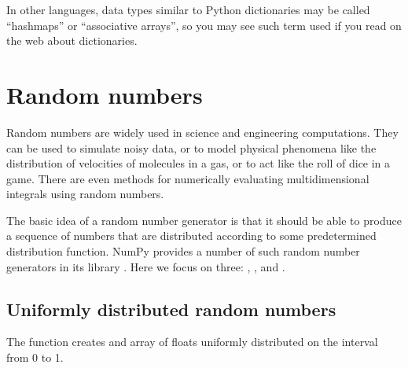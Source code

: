 \documentclass[letterpaper,10pt,english]{sphinxmanual}
\begin{document}
\sphinxAtStartPar
In other languages, data types similar to Python dictionaries may be called “hashmaps” or “associative arrays”, so you may see such term used if you read on the web about dictionaries.

\ignorespaces 

\section{Random numbers}
\label{\detokenize{chap3/chap3_arrays:random-numbers}}\label{\detokenize{chap3/chap3_arrays:index-8}}
\sphinxAtStartPar
Random numbers are widely used in science and engineering computations.  They can be used to simulate noisy data, or to model physical phenomena like the distribution of velocities of molecules in a gas, or to act like the roll of dice in a game.  There are even methods for numerically evaluating multi\sphinxhyphen{}dimensional integrals using random numbers.

\sphinxAtStartPar
The basic idea of a random number generator is that it should be able to produce a sequence of numbers that are distributed according to some predetermined distribution function.  NumPy provides a number of such random number generators in its library .  Here we focus on three: , , and .


\subsection{Uniformly distributed random numbers}
\label{\detokenize{chap3/chap3_arrays:uniformly-distributed-random-numbers}}
\sphinxAtStartPar
The  function creates and array of  floats uniformly distributed on the interval from 0 to 1.

\begin{sphinxVerbatim}[commandchars=\\\{\},numbers=left,firstnumber=1,stepnumber=1]

\PYG{p}{[}   
\PYG{g+go}{                0.65943861, 0.25519987])}
\end{sphinxVerbatim}
\end{document}

